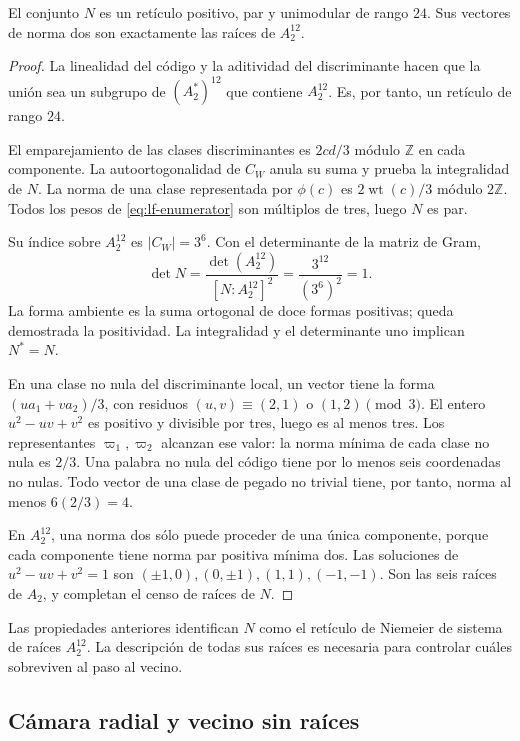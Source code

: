 \begin{theorem}
\label{thm:lf-niemeier}
El conjunto \(N\) es un retículo positivo, par y
unimodular de rango \(24\). Sus vectores de norma dos
son exactamente las raíces de \(A_2^{12}\).
\end{theorem}
\begin{proof}
La linealidad del código y la aditividad del discriminante
hacen que la unión sea un subgrupo de
\((A_2^*)^{12}\) que contiene \(A_2^{12}\).
Es, por tanto, un retículo de rango \(24\).

El emparejamiento de las clases discriminantes es
\(2cd/3\) módulo \(\mathbb Z\) en cada componente.
La autoortogonalidad de \(C_W\) anula su suma y prueba
la integralidad de \(N\). La norma de una clase
representada por \(\phi(c)\) es
\(2\operatorname{wt}(c)/3\) módulo \(2\mathbb Z\).
Todos los pesos de \eqref{eq:lf-enumerator} son
múltiplos de tres, luego \(N\) es par.

Su índice sobre \(A_2^{12}\) es \(|C_W|=3^6\).
Con el determinante de la matriz de Gram,
\[
 \det N=\frac{\det(A_2^{12})}{[N:A_2^{12}]^2}
       =\frac{3^{12}}{(3^6)^2}=1.
\]
La forma ambiente es la suma ortogonal de doce formas
positivas; queda demostrada la positividad.
La integralidad y el determinante uno implican
\(N^*=N\).

En una clase no nula del discriminante local, un
vector tiene la forma \((ua_1+va_2)/3\), con residuos
\((u,v)\equiv(2,1)\) o \((1,2)\pmod3\).
El entero \(u^2-uv+v^2\) es positivo y divisible
por tres, luego es al menos tres. Los representantes
\(\varpi_1,\varpi_2\) alcanzan ese valor: la norma
mínima de cada clase no nula es \(2/3\).
Una palabra no nula del código tiene por lo menos
seis coordenadas no nulas. Todo vector de una clase
de pegado no trivial tiene, por tanto, norma
al menos \(6(2/3)=4\).

En \(A_2^{12}\), una norma dos sólo puede proceder
de una única componente, porque cada componente
tiene norma par positiva mínima dos. Las soluciones
de \(u^2-uv+v^2=1\) son
\((\pm1,0),(0,\pm1),(1,1),(-1,-1)\).
Son las seis raíces de \(A_2\), y completan el censo
de raíces de \(N\).
\end{proof}

Las propiedades anteriores identifican \(N\) como el
retículo de Niemeier de sistema de raíces \(A_2^{12}\).
La descripción de todas sus raíces es necesaria para
controlar cuáles sobreviven al paso al vecino.

\subsection{Cámara radial y vecino sin raíces}
\label{subsec:lf-neighbour}

